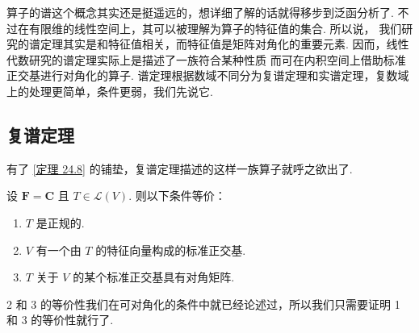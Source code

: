 算子的谱这个概念其实还是挺遥远的，想详细了解的话就得移步到泛函分析了. 
不过在有限维的线性空间上，其可以被理解为算子的特征值的集合. 所以说，
我们研究的谱定理其实是和特征值相关，而特征值是矩阵对角化的重要元素. 
因而，线性代数研究的谱定理实际上是描述了一族符合某种性质
而可在内积空间上借助标准正交基进行对角化的算子. 
谱定理根据数域不同分为复谱定理和实谱定理，复数域上的处理更简单，条件更弱，我们先说它. 

\subsection{复谱定理}

有了 \ref{定理 24.8} 的铺垫，复谱定理描述的这样一族算子就呼之欲出了. 

\begin{theorem} 
    设 $ \mathbf{F} = \mathbf{C} $ 且 $ T \in \mathcal{L}(V) $. 则以下条件等价：
    \begin{enumerate}
        \item $ T $ 是正规的.
        
        \item $ V $ 有一个由 $ T $ 的特征向量构成的标准正交基.
        
        \item $ T $ 关于 $ V $ 的某个标准正交基具有对角矩阵. 
    \end{enumerate}
\end{theorem}

2 和 3 的等价性我们在可对角化的条件中就已经论述过，所以我们只需要证明 1 和 3 的等价性就行了. 

